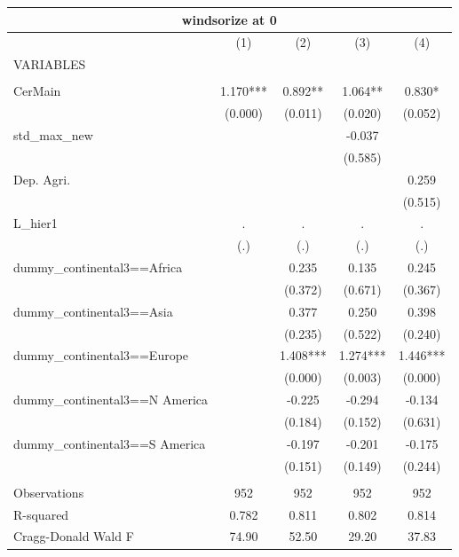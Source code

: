 \documentclass[12pt,a4paper]{article}
\begin{document}
\begin{tabular}{lcccc}
\multicolumn{5}{c}{windsorize at 0} \\ \hline
 & (1) & (2) & (3) & (4) \\
VARIABLES &  &  &  &  \\ \hline
 &  &  &  &  \\
CerMain & 1.170*** & 0.892** & 1.064** & 0.830* \\
 & (0.000) & (0.011) & (0.020) & (0.052) \\
std\_max\_new &  &  & -0.037 &  \\
 &  &  & (0.585) &  \\
Dep. Agri. &  &  &  & 0.259 \\
 &  &  &  & (0.515) \\
L\_hier1 & . & . & . & . \\
 & (.) & (.) & (.) & (.) \\
dummy\_continental3==Africa &  & 0.235 & 0.135 & 0.245 \\
 &  & (0.372) & (0.671) & (0.367) \\
dummy\_continental3==Asia &  & 0.377 & 0.250 & 0.398 \\
 &  & (0.235) & (0.522) & (0.240) \\
dummy\_continental3==Europe &  & 1.408*** & 1.274*** & 1.446*** \\
 &  & (0.000) & (0.003) & (0.000) \\
dummy\_continental3==N America &  & -0.225 & -0.294 & -0.134 \\
 &  & (0.184) & (0.152) & (0.631) \\
dummy\_continental3==S America &  & -0.197 & -0.201 & -0.175 \\
 &  & (0.151) & (0.149) & (0.244) \\
 &  &  &  &  \\
Observations & 952 & 952 & 952 & 952 \\
R-squared & 0.782 & 0.811 & 0.802 & 0.814 \\
 Cragg-Donald Wald F & 74.90 & 52.50 & 29.20 & 37.83 \\ \hline
\end{tabular}
\end{document}
